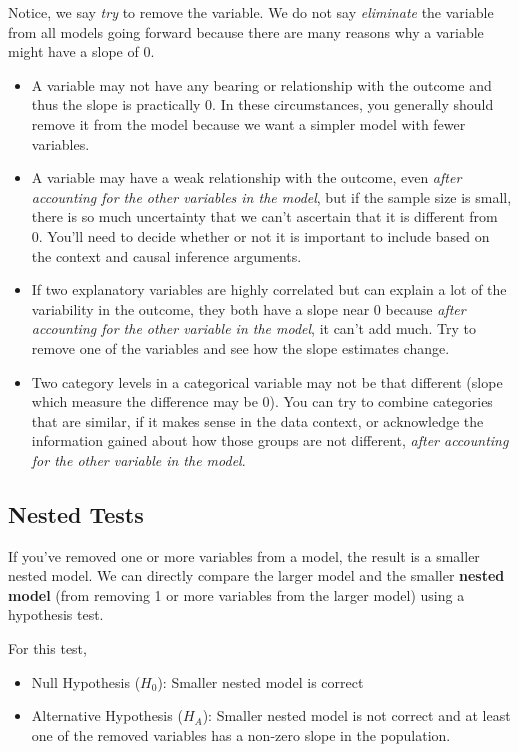 \documentclass[
]{book}
\providecommand{\tightlist}{%
  \setlength{\itemsep}{0pt}\setlength{\parskip}{0pt}}
\begin{document}
Notice, we say \emph{try} to remove the variable. We do not say \emph{eliminate} the variable from all models going forward because there are many reasons why a variable might have a slope of 0.

\begin{itemize}
\tightlist
\item
  A variable may not have any bearing or relationship with the outcome and thus the slope is practically 0. In these circumstances, you generally should remove it from the model because we want a simpler model with fewer variables.
\item
  A variable may have a weak relationship with the outcome, even \emph{after accounting for the other variables in the model}, but if the sample size is small, there is so much uncertainty that we can't ascertain that it is different from 0. You'll need to decide whether or not it is important to include based on the context and causal inference arguments.
\item
  If two explanatory variables are highly correlated but can explain a lot of the variability in the outcome, they both have a slope near 0 because \emph{after accounting for the other variable in the model}, it can't add much. Try to remove one of the variables and see how the slope estimates change.
\item
  Two category levels in a categorical variable may not be that different (slope which measure the difference may be 0). You can try to combine categories that are similar, if it makes sense in the data context, or acknowledge the information gained about how those groups are not different, \emph{after accounting for the other variable in the model}.
\end{itemize}

\hypertarget{nested-tests}{%
\subsection{Nested Tests}\label{nested-tests}}

If you've removed one or more variables from a model, the result is a smaller nested model. We can directly compare the larger model and the smaller \textbf{nested model} (from removing 1 or more variables from the larger model) using a hypothesis test.

For this test,

\begin{itemize}
\tightlist
\item
  Null Hypothesis (\(H_0\)): Smaller nested model is correct
\item
  Alternative Hypothesis (\(H_A\)): Smaller nested model is not correct and at least one of the removed variables has a non-zero slope in the population.
\end{itemize}
\end{document}
